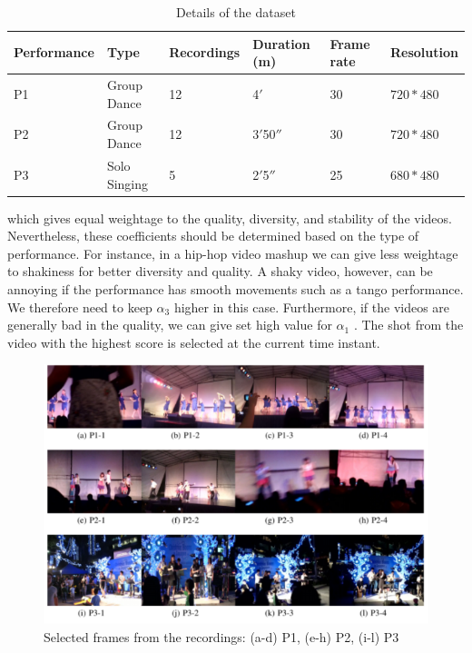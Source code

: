 \documentclass{sig-alternate-05-2015}
\begin{document}
\begin{table}
\centering
\caption{Details of the dataset}
 \begin{tabular}{ L{1cm} |L{1cm} | L{1.5cm}| L{1cm}| L{1cm} |L{1cm} } 
 \hline

 Performance & Type & Recordings & Duration
(m) & Frame rate & Resolution\\
 \hline
P1 & Group Dance & 12 & 4$'$ &30 & $720 \ast 480$
\\
\hline
P2 & Group Dance & 12 & 3$'$50$''$ &30 & $720 \ast 480$
\\
\hline
P3 & Solo Singing & 5 & 2$'$5$''$ &25 & $680 \ast 480$
\\
\hline
 \end{tabular}
\end{table}
which gives equal weightage to the quality, diversity, and stability of the videos. Nevertheless, these coefficients should be determined based on the type of performance. For instance, in a hip-hop
video mashup we can give less weightage to shakiness for better diversity and quality. A shaky video, however, can be annoying if the
performance has smooth movements such as a tango performance.
We therefore need to keep $\alpha_3$ higher in this case. Furthermore, if
the videos are generally bad in the quality, we can give set high
value for $\alpha_1$ . The shot from the video with the highest score is
selected at the current time instant.

\begin{figure}[t]
\includegraphics[width=1\linewidth]{img6.png}
\caption{Selected frames from the recordings: (a-d) P1, (e-h) P2, (i-l) P3}
\label{fig:block-diagram}
\end{figure}
\end{document}
